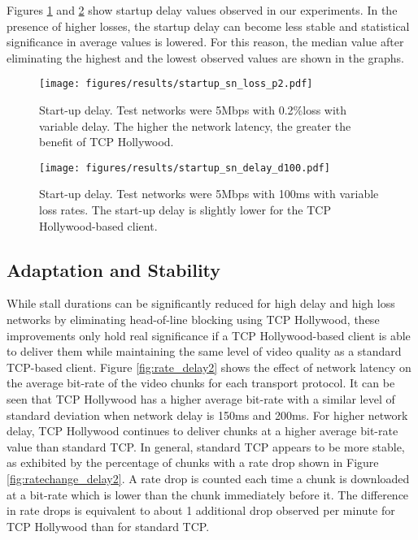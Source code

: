Figures \ref{fig:startup_delay2} and \ref{fig:startup_loss} show startup delay values
observed in our experiments. In the presence of higher losses, the startup delay can
become less stable and statistical significance in average values is lowered. For this
reason, the median value after eliminating the highest and the lowest observed values are
shown in the graphs.

\begin{figure}
  \centering
  \texttt{[image: figures/results/startup\_sn\_loss\_p2.pdf]}
  \caption{Start-up delay. Test networks were 5Mbps with 0.2\%loss with variable delay. 
           The higher the network latency, the greater the benefit of TCP Hollywood. }
  \label{fig:startup_delay2}
\end{figure}


\begin{figure}
  \centering
  \texttt{[image: figures/results/startup\_sn\_delay\_d100.pdf]}
  \caption{Start-up delay. Test networks were 5Mbps with 100ms with variable loss rates.  
           The start-up delay is slightly lower for the TCP Hollywood-based client.}
  \label{fig:startup_loss}
\end{figure}

\subsection{Adaptation and Stability}
While stall durations can be significantly reduced for high delay and high loss networks
by eliminating head-of-line blocking using TCP Hollywood, these improvements only hold
real significance if a TCP Hollywood-based client is able to deliver them while maintaining
the same level of video quality as a standard TCP-based client. Figure \ref{fig:rate_delay2} 
shows the effect of network latency on the average bit-rate of the video chunks for each transport
protocol. It can be seen that TCP Hollywood has a higher average bit-rate with a similar
level of standard deviation when network delay is 150ms and 200ms. For higher network
delay, TCP Hollywood continues to deliver chunks at a higher average bit-rate value than
standard TCP. In general, standard TCP appears to be more stable, as exhibited by the
percentage of chunks with a rate drop shown in Figure \ref{fig:ratechange_delay2}. A rate
drop is counted each time a chunk is downloaded at a bit-rate which is lower than the chunk
immediately before it. The difference in rate drops is equivalent to about 1 additional
drop observed per minute for TCP Hollywood than for standard TCP.

